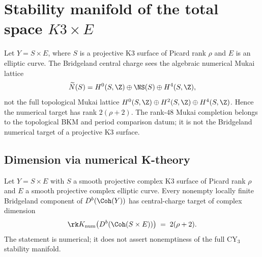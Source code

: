 \section{Stability manifold of the total space \texorpdfstring{$K3 \times E$}{K3 x E}}
\label{sec:dcy-stab-k3-times-e}

Let $Y = S \times E$, where $S$ is a projective K3 surface of Picard rank $\rho$ and $E$ is an elliptic curve. The Bridgeland central charge sees the algebraic numerical Mukai lattice
\[
 \widetilde{N}(S) = H^0(S,\Z) \oplus \NS(S) \oplus H^4(S,\Z),
\]
not the full topological Mukai lattice $H^0(S,\Z) \oplus H^2(S,\Z) \oplus H^4(S,\Z)$. Hence the numerical target has rank $2(\rho+2)$. The rank-$48$ Mukai completion belongs to the topological BKM and period comparison datum; it is not the Bridgeland numerical target of a projective K3 surface.

\subsection{Dimension via numerical K-theory}
\label{subsec:dcy-stab-dim-k3-times-e}

\begin{theorem}
\label{thm:dcy-stab-dim-48}
Let $Y = S \times E$ with $S$ a smooth projective complex K3 surface of Picard rank $\rho$ and $E$ a smooth projective complex elliptic curve. Every nonempty locally finite Bridgeland component of $D^b(\Coh(Y))$ has central-charge target of complex dimension
\[
 \rk K_{\mathrm{num}}\bigl(D^b(\Coh(S \times E))\bigr) \;=\; 2(\rho+2).
\]
The statement is numerical; it does not assert nonemptiness of the full CY$_3$ stability manifold.
\end{theorem}

